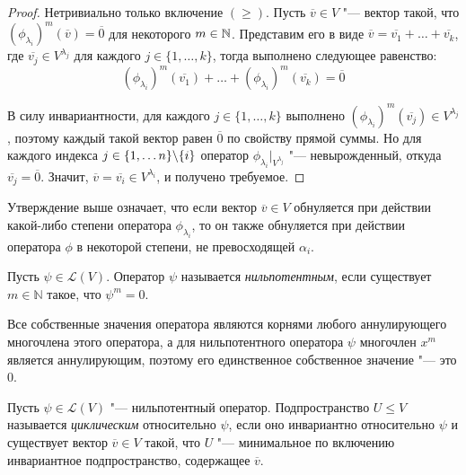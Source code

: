 \begin{proof}
	Нетривиально только включение $(\ge)$. Пусть $\overline{v} \in V$ "--- вектор такой, что $(\phi_{\lambda_i})^m(\overline{v}) = \overline{0}$ для некоторого $m \in \mathbb{N}$. Представим его в виде $\overline{v} = \overline{v_1} + \dots + \overline{v_k}$, где $\overline{v_j} \in V^{\lambda_j}$ для каждого $j \in \{1, \dotsc, k\}$, тогда выполнено следующее равенство:
	\[(\phi_{\lambda_i})^m(\overline{v_1}) + \dots +  (\phi_{\lambda_i})^m(\overline{v_k}) = \overline{0}\]
	
	В силу инвариантности, для каждого $j \in \{1, \dotsc, k\}$ выполнено $(\phi_{\lambda_i})^m(\overline{v_j}) \in V^{\lambda_j}$, поэтому каждый такой вектор равен $\overline 0$ по свойству прямой суммы. Но для каждого индекса $j \in \{1, \dotsc n\} \backslash \{i\}$ оператор $\phi_{\lambda_i}|_{V^{\lambda_j}}$ "--- невырожденный, откуда $\overline{v_j} = \overline{0}$. Значит, $\overline{v} = \overline{v_i} \in V^{\lambda_i}$, и получено требуемое.
\end{proof}

\begin{note}
	Утверждение выше означает, что если вектор $\overline{v} \in V$ обнуляется при действии какой-либо степени оператора $\phi_{\lambda_i}$, то он также обнуляется при действии оператора $\phi$ в некоторой степени, не превосходящей $\alpha_i$.
\end{note}

\begin{definition}
	Пусть $\psi \in \mathcal{L}(V)$. Оператор $\psi$ называется \textit{нильпотентным}, если существует $m \in \mathbb{N}$ такое, что $\psi^m = 0$.
\end{definition}

\begin{note}
	Все собственные значения оператора являются корнями любого аннулирующего многочлена этого оператора, а для нильпотентного оператора $\psi$ многочлен $x^m$ является аннулирующим, поэтому его единственное собственное значение "--- это $0$.
\end{note}

\begin{definition}
	Пусть $\psi \in \mathcal{L}(V)$ "--- нильпотентный оператор. Подпространство $U \le V$ называется \textit{циклическим} относительно $\psi$, если оно инвариантно относительно $\psi$ и существует вектор $\overline{v} \in V$ такой, что $U$ "--- минимальное по включению инвариантное подпространство, содержащее $\overline{v}$.
\end{definition}

